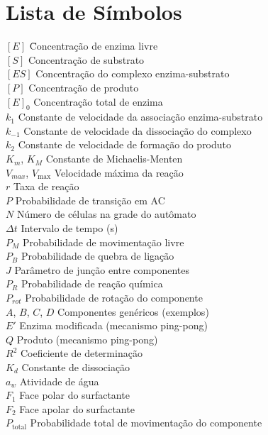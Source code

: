 \documentclass[12pt,oneside]{report}
\begin{document}
\chapter*{Lista de Símbolos}
\begin{tabbing}
    $[E]$ \hspace{2cm} \= Concentração de enzima livre \\
    $[S]$ \> Concentração de substrato \\
    $[ES]$ \> Concentração do complexo enzima-substrato \\
    $[P]$ \> Concentração de produto \\
    $[E]_0$ \> Concentração total de enzima \\
    $k_1$ \> Constante de velocidade da associação enzima-substrato \\
    $k_{-1}$ \> Constante de velocidade da dissociação do complexo \\
    $k_2$ \> Constante de velocidade de formação do produto \\
    $K_m$, $K_M$ \> Constante de Michaelis-Menten \\
    $V_{max}$, $V_{\max}$ \> Velocidade máxima da reação \\
    $r$ \> Taxa de reação \\
    $P$ \> Probabilidade de transição em AC \\
    $N$ \> Número de células na grade do autômato \\
    $\Delta t$ \> Intervalo de tempo (s) \\
    $P_M$ \> Probabilidade de movimentação livre \\
    $P_B$ \> Probabilidade de quebra de ligação \\
    $J$ \> Parâmetro de junção entre componentes \\
    $P_R$ \> Probabilidade de reação química \\
    $P_{rot}$ \> Probabilidade de rotação do componente \\
    $A$, $B$, $C$, $D$ \> Componentes genéricos (exemplos) \\
    $E'$ \> Enzima modificada (mecanismo ping-pong) \\
    $Q$ \> Produto (mecanismo ping-pong) \\
    $R^2$ \> Coeficiente de determinação \\
    $K_d$ \> Constante de dissociação \\
    $a_w$ \> Atividade de água \\
    $F_1$ \> Face polar do surfactante \\
    $F_2$ \> Face apolar do surfactante \\
    $P_{\text{total}}$ \> Probabilidade total de movimentação do componente \\
\end{tabbing}
\end{document}
